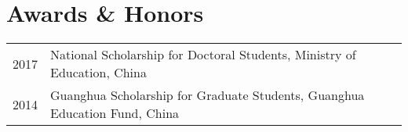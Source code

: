 \section*{Awards \& Honors}

\begin{tabular}{p{} p{}}
2017 & National Scholarship for Doctoral Students, Ministry of Education, China \\
2014 & Guanghua Scholarship for Graduate Students, Guanghua Education Fund, China \\
\end{tabular}
